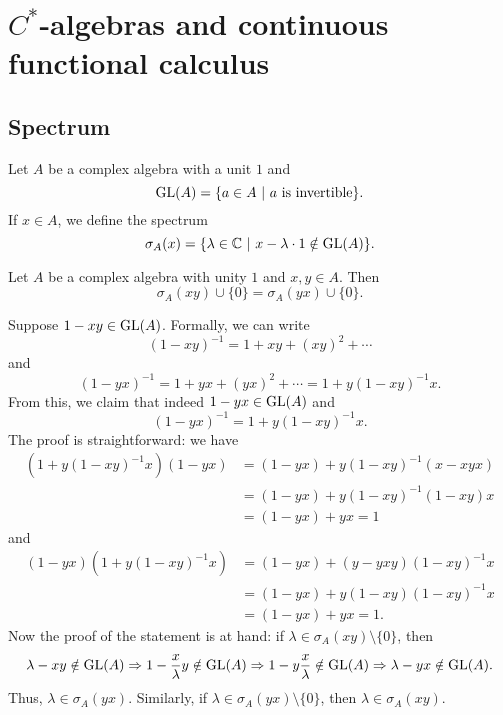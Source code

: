 \section{$C^*$-algebras and continuous functional calculus}

\subsection{Spectrum}

Let $A$ be a complex algebra with a unit $1$ and 
$$\operatorname{GL} (A) = \{a \in A\ |\ \textrm{$a$ is invertible}\}.$$
If $x \in A$, we define the spectrum 
$$\sigma_A (x) = \{\lambda \in \mathbb {C}\ |\ x - \lambda \cdot 1 \notin \operatorname{GL}(A)\}.$$
\begin{proposition}\label{prop:1}
  Let $A$ be a complex algebra with unity $1$ and $x, y \in A$. Then 
  $$\sigma_A (xy) \cup \{0\} = \sigma_A (yx) \cup \{0\}.$$
\end{proposition}

\begin{myproof}
  Suppose $1 - xy \in \operatorname{GL}(A)$. Formally, we can write 
  $$(1 - xy)^{-1} = 1 + xy + (xy)^2 + \cdots$$
  and $$(1 - yx)^{-1} = 1 + yx + (yx)^2 + \cdots = 1 + y(1 - xy)^{-1} x.$$
  From this, we claim that indeed $1 - yx \in \operatorname{GL} (A)$ and 
  $$(1 - yx)^{-1} = 1 + y(1 - xy)^{-1} x.$$ 
  The proof is straightforward: we have
  \begin{align*}
    (1 + y(1 - xy)^{-1} x)(1 - yx) &= (1 - yx) + y(1 - xy)^{-1} (x - xyx)\\
    &= (1 - yx) + y (1 - xy)^{-1} (1 - xy) x\\
    &= (1 - yx) + yx = 1
  \end{align*} 
  and 
  \begin{align*}
    (1 - yx) (1 + y(1 - xy)^{-1} x) &= (1 - yx) + (y - yxy) (1 - xy)^{-1} x\\
    &= (1 - yx) + y(1 - xy) (1 - xy)^{-1} x\\
    &= (1 - yx) + yx = 1.
  \end{align*}
  Now the proof of the statement is at hand: if $\lambda \in \sigma_A (xy) \setminus \{0\}$,
  then \begin{align*}
    \lambda - xy \notin \operatorname{GL} (A) \Rightarrow 1 - \frac{x}{\lambda} y \notin \operatorname{GL} (A) \Rightarrow 1 - y \frac{x}{\lambda} \notin \operatorname{GL} (A) \Rightarrow \lambda - yx \notin \operatorname{GL} (A).
  \end{align*}
  Thus, $\lambda \in \sigma_A (yx)$.
  Similarly, if $\lambda \in \sigma_A (yx) \setminus \{0\}$, then $\lambda \in \sigma_A (xy)$.
\end{myproof}

